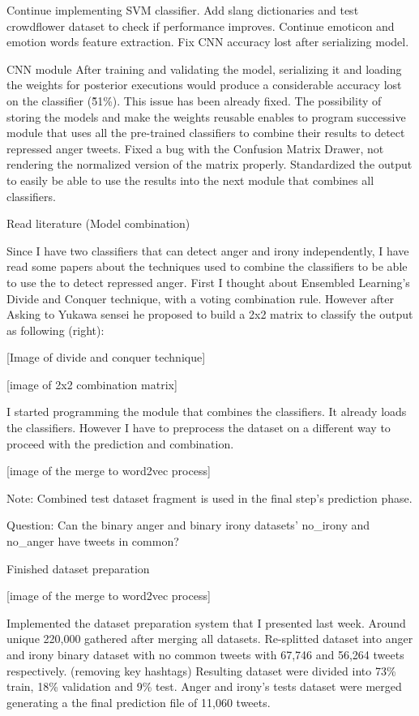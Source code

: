 Continue implementing SVM classifier.
Add slang dictionaries and test crowdflower dataset to check if performance improves.
Continue emoticon and emotion words feature extraction.
Fix CNN accuracy lost after serializing model.

CNN module
After training and validating the model, serializing it and loading the weights for posterior executions would produce a considerable accuracy lost on the classifier (\~51\%). This issue has been already fixed. The possibility of storing the models and make the weights reusable enables to program successive module that uses all the pre-trained classifiers to combine their results to detect repressed anger tweets.
Fixed a bug with the Confusion Matrix Drawer, not rendering the normalized version of the matrix properly.
Standardized the output to easily be able to use the results into the next module that combines all classifiers.

Read literature (Model combination)

Since I have two classifiers that can detect anger and irony independently, I have read some papers about the techniques used to combine the classifiers to be able to use the to detect repressed anger. First I thought about Ensembled Learning’s Divide and Conquer technique, with a voting combination rule. However after Asking to Yukawa sensei he proposed to build a 2x2 matrix to classify the output as following (right):

[Image of divide and conquer technique]

[image of 2x2 combination matrix]

I started programming the module that combines the classifiers. It already loads the classifiers. However I have to preprocess the dataset on a different way to proceed with the prediction and combination.

[image of the merge to word2vec process]

Note: Combined test dataset fragment is used in the final step’s prediction phase.

Question:
Can the binary anger and binary irony datasets’ no\_irony and no\_anger have tweets in common?

Finished dataset preparation

[image of the merge to word2vec process]

Implemented the dataset preparation system that I presented last week.
Around unique 220,000 gathered after merging all datasets.
Re-splitted dataset into anger and irony binary dataset with no common tweets with 67,746 and 56,264 tweets respectively. (removing key hashtags)
Resulting dataset were divided into 73\% train, 18\% validation and 9\% test.
Anger and irony’s tests dataset were merged generating a the final prediction file of 11,060 tweets.


